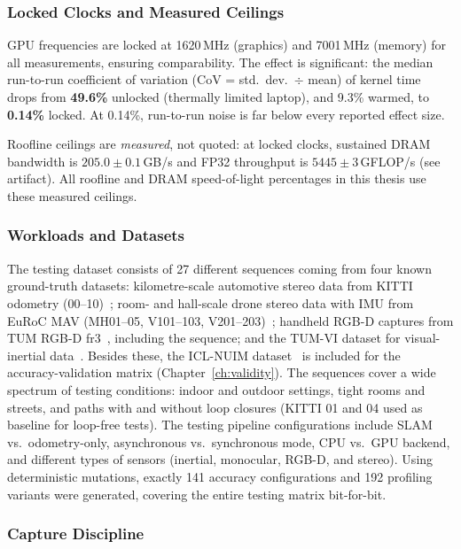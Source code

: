 \subsubsection{Locked Clocks and Measured Ceilings}
\label{sec:met-clocks}

GPU frequencies are locked at 1620\,MHz (graphics) and 7001\,MHz (memory) for all measurements, ensuring comparability. The effect is significant: the median run-to-run coefficient of variation (CoV = std.\ dev.\ $\div$ mean) of kernel time drops from \textbf{49.6\%} unlocked (thermally limited laptop), and 9.3\% warmed, to \textbf{0.14\%} locked. At 0.14\%, run-to-run noise is far below every reported effect size.

Roofline ceilings are \emph{measured}, not quoted: at locked clocks, sustained DRAM bandwidth is $205.0 \pm 0.1$\,GB/s and FP32 throughput is $5445 \pm 3$\,GFLOP/s (see artifact). All roofline and DRAM speed-of-light percentages in this thesis use these measured ceilings.

\subsubsection{Workloads and Datasets}
\label{sec:met-datasets}

The testing dataset consists of 27 different sequences coming from four known ground-truth datasets: kilometre-scale automotive stereo data from KITTI odometry (00--10)~\cite{geiger2013kitti}; room- and hall-scale drone stereo data with IMU from EuRoC MAV (MH01--05, V101--103, V201--203)~\cite{burri2016euroc}; handheld RGB-D captures from TUM RGB-D fr3~\cite{sturm2012tum}, including the  sequence; and the TUM-VI dataset for visual-inertial data~\cite{schubert2018tumvi}. Besides these, the ICL-NUIM dataset~\cite{handa2014iclnuim} is included for the accuracy-validation matrix (Chapter~\ref{ch:validity}). The sequences cover a wide spectrum of testing conditions: indoor and outdoor settings, tight rooms and streets, and paths with and without loop closures (KITTI 01 and 04 used as baseline for loop-free tests). The testing pipeline configurations include SLAM vs.\ odometry-only, asynchronous vs.\ synchronous mode, CPU vs.\ GPU backend, and different types of sensors (inertial, monocular, RGB-D, and stereo). Using deterministic mutations, exactly 141 accuracy configurations and 192 profiling variants were generated, covering the entire testing matrix bit-for-bit.

\subsubsection{Capture Discipline}

